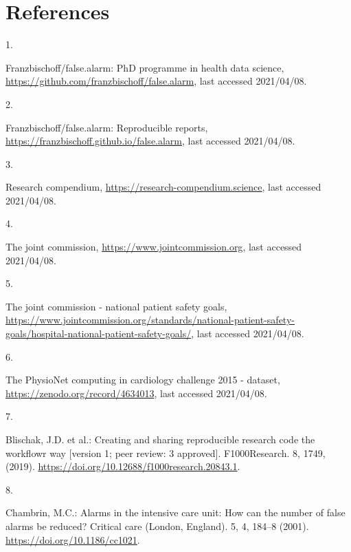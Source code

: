 \documentclass[runningheads]{llncs}
\newlength{\cslhangindent}
\newlength{\csllabelwidth}
\newenvironment{CSLReferences}[2] %
 {%
  \setlength{\parindent}{0pt}
  \ifodd #1 \everypar{\setlength{\hangindent}{\cslhangindent}}\ignorespaces\fi
  \ifnum #2 > 0
  \setlength{\parskip}{#2\baselineskip}
  \fi
 }%
 {}
\newcommand{\CSLLeftMargin}[1]{\parbox[t]{\csllabelwidth}{#1}}
\newcommand{\CSLRightInline}[1]{\parbox[t]{\linewidth - \csllabelwidth}{#1}\break}
\begin{document}
\hypertarget{references}{%
\section*{References}\label{references}}

\hypertarget{refs}{}
\begin{CSLReferences}{0}{0}
\leavevmode{}%
\CSLLeftMargin{1. }
\CSLRightInline{Franzbischoff/false.alarm: PhD programme in health data
science, \url{https://github.com/franzbischoff/false.alarm}, last
accessed 2021/04/08.}

\leavevmode{}%
\CSLLeftMargin{2. }
\CSLRightInline{Franzbischoff/false.alarm: Reproducible reports,
\url{https://franzbischoff.github.io/false.alarm}, last accessed
2021/04/08.}

\leavevmode{}%
\CSLLeftMargin{3. }
\CSLRightInline{Research compendium,
\url{https://research-compendium.science}, last accessed 2021/04/08.}

\leavevmode{}%
\CSLLeftMargin{4. }
\CSLRightInline{The joint commission,
\url{https://www.jointcommission.org}, last accessed 2021/04/08.}

\leavevmode{}%
\CSLLeftMargin{5. }
\CSLRightInline{The joint commission - national patient safety goals,
\url{https://www.jointcommission.org/standards/national-patient-safety-goals/hospital-national-patient-safety-goals/},
last accessed 2021/04/08.}

\leavevmode{}%
\CSLLeftMargin{6. }
\CSLRightInline{The PhysioNet computing in cardiology challenge 2015 -
dataset, \url{https://zenodo.org/record/4634013}, last accessed
2021/04/08.}

\leavevmode{}%
\CSLLeftMargin{7. }
\CSLRightInline{Blischak, J.D. et al.: Creating and sharing reproducible
research code the workflowr way {[}version 1; peer review: 3
approved{]}. F1000Research. 8, 1749, (2019).
\url{https://doi.org/10.12688/f1000research.20843.1}.}

\leavevmode{}%
\CSLLeftMargin{8. }
\CSLRightInline{Chambrin, M.C.: Alarms in the intensive care unit: How
can the number of false alarms be reduced? Critical care (London,
England). 5, 4, 184--8 (2001). \url{https://doi.org/10.1186/cc1021}.}


\end{CSLReferences}
\end{document}
